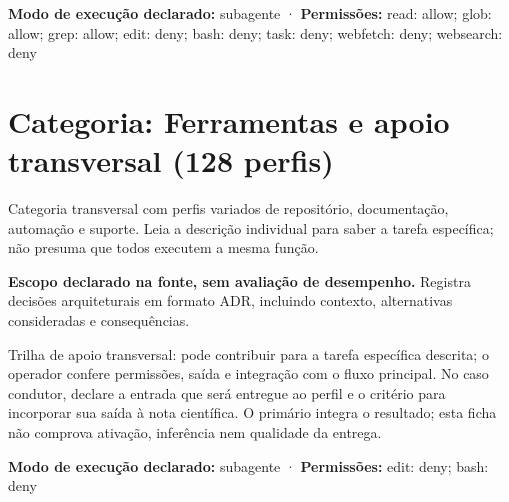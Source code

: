 \begin{arquitetura}
\textbf{Modo de execução declarado:} subagente · \textbf{Permissões:} read: allow; glob: allow; grep: allow; edit: deny; bash: deny; task: deny; webfetch: deny; websearch: deny
\end{arquitetura}

\clearpage
\section{Categoria: Ferramentas e apoio transversal (128 perfis)}

\begin{descricao}
Categoria transversal com perfis variados de repositório, documentação, automação e suporte. Leia a descrição individual para saber a tarefa específica; não presuma que todos executem a mesma função.
\end{descricao}


\begin{descricao}
\textbf{Escopo declarado na fonte, sem avaliação de desempenho.}
Registra decisões arquiteturais em formato ADR, incluindo contexto, alternativas consideradas e consequências.
\end{descricao}

\begin{funcao}
Trilha de apoio transversal: pode contribuir para a tarefa específica descrita; o operador confere permissões, saída e integração com o fluxo principal. No caso condutor, declare a entrada que será entregue ao perfil e o critério para incorporar sua saída à nota científica. O primário integra o resultado; esta ficha não comprova ativação, inferência nem qualidade da entrega.
\end{funcao}

\begin{arquitetura}
\textbf{Modo de execução declarado:} subagente · \textbf{Permissões:} edit: deny; bash: deny
\end{arquitetura}


